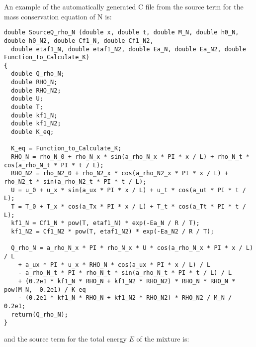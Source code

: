 \documentclass[10pt]{article}
\begin{document}
An example of the automatically generated C file from the source term for the mass conservation equation of N is:
\begin{footnotesize}
 \begin{verbatim}
double SourceQ_rho_N (double x, double t, double M_N, double h0_N, double h0_N2, double Cf1_N, double Cf1_N2,
  double etaf1_N, double etaf1_N2, double Ea_N, double Ea_N2, double Function_to_Calculate_K)
{
  double Q_rho_N;
  double RHO_N;
  double RHO_N2;
  double U;
  double T;
  double kf1_N;
  double kf1_N2;
  double K_eq;

  K_eq = Function_to_Calculate_K;
  RHO_N = rho_N_0 + rho_N_x * sin(a_rho_N_x * PI * x / L) + rho_N_t * cos(a_rho_N_t * PI * t / L);
  RHO_N2 = rho_N2_0 + rho_N2_x * cos(a_rho_N2_x * PI * x / L) + rho_N2_t * sin(a_rho_N2_t * PI * t / L);
  U = u_0 + u_x * sin(a_ux * PI * x / L) + u_t * cos(a_ut * PI * t / L);
  T = T_0 + T_x * cos(a_Tx * PI * x / L) + T_t * cos(a_Tt * PI * t / L);
  kf1_N = Cf1_N * pow(T, etaf1_N) * exp(-Ea_N / R / T);
  kf1_N2 = Cf1_N2 * pow(T, etaf1_N2) * exp(-Ea_N2 / R / T);

  Q_rho_N = a_rho_N_x * PI * rho_N_x * U * cos(a_rho_N_x * PI * x / L) / L
    + a_ux * PI * u_x * RHO_N * cos(a_ux * PI * x / L) / L
    - a_rho_N_t * PI * rho_N_t * sin(a_rho_N_t * PI * t / L) / L
    + (0.2e1 * kf1_N * RHO_N + kf1_N2 * RHO_N2) * RHO_N * RHO_N * pow(M_N, -0.2e1) / K_eq
    - (0.2e1 * kf1_N * RHO_N + kf1_N2 * RHO_N2) * RHO_N2 / M_N / 0.2e1;
  return(Q_rho_N);
}
 \end{verbatim}
\end{footnotesize}
%
and the source term for the total energy $E$ of the mixture is:
%
\end{document}
